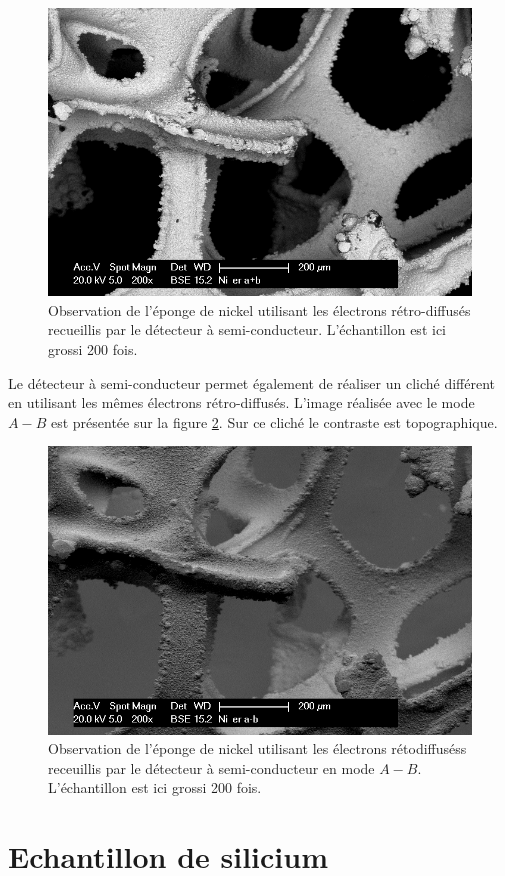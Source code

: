 \documentclass[a4paper,12pt]{article}
\begin{document}
\begin{figure}
\centering
\includegraphics[width = 0.7 \textwidth]{images/ni_er_apb.png}
\caption{Observation de l'éponge de nickel utilisant les électrons rétro-diffusés recueillis par le détecteur à semi-conducteur. L'échantillon est ici grossi 200 fois.}
\label{fig:ni_er_apb}
\end{figure}



Le détecteur à semi-conducteur permet également de réaliser un cliché différent en utilisant les mêmes électrons
rétro-diffusés. L'image réalisée avec le mode $A-B$ est présentée sur la figure \ref{fig:ni_er_amb}. Sur ce cliché
le contraste est topographique.

\begin{figure}
\centering
\includegraphics[width = 0.7 \textwidth]{images/ni_er_amb.png}
\caption{Observation de l'éponge de nickel utilisant les électrons rétodiffuséss receuillis par le détecteur à semi-conducteur en mode $A-B$. L'échantillon est ici grossi 200 fois.}
\label{fig:ni_er_amb}
\end{figure}
 

\section{Echantillon de silicium}
\end{document}
